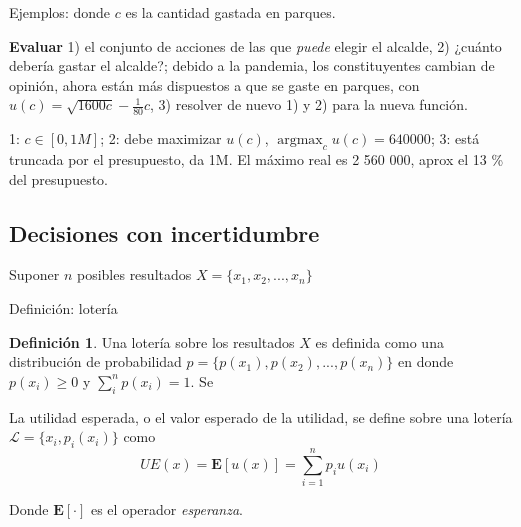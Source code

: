 \documentclass[12pt]{scrartcl}
\theoremstyle{definition}
\newtheorem{defi}{Definición}[section]
\DeclareMathOperator*{\argmax}{argmax}
\begin{document}
\begin{exbox}{Ejemplos:}
donde $c$ es la cantidad gastada en parques. 

\textbf{Evaluar} 1) el conjunto de acciones de las que \textit{puede} elegir el alcalde, 2) ¿cuánto debería gastar el alcalde?; debido a la pandemia, los constituyentes cambian de opinión, ahora están más dispuestos a que se gaste en parques, con $u(c)=\sqrt{1600c}-\frac{1}{80}c$, 3) resolver de nuevo 1) y 2) para la nueva función.

1: $c\in [0, 1M]$; 2: debe maximizar $u(c)$, $\argmax_{c} u(c) = 640000$; 3: está truncada por el presupuesto, da 1M. El máximo real es 2 560 000, aprox el 13 \% del presupuesto.
\end{exbox}

\subsection{Decisiones con incertidumbre}

Suponer $n$ posibles resultados $X=\{ x_1,x_2, ..., x_n \}$

\begin{mybox}{Definición: lotería}
\begin{defi}
    Una lotería sobre los resultados $X$ es definida como una distribución de probabilidad $p=\{ p(x_1), p(x_2), ..., p(x_n)\}$ en donde $p(x_i) \geq 0$ y $\sum_{i}^n p(x_i)=1$. Se
\end{defi}
\end{mybox}

La utilidad esperada, o el valor esperado de la utilidad, se define sobre una lotería $\mathcal{L}=\{x_i, p_i(x_i)\}$ como
\[UE(x) = \mathbf{E}[u(x)] = \sum_{i=1}^{n}p_iu(x_i)\]

Donde $\mathbf{E}[\cdot]$ es el operador \textit{esperanza}. 
\end{document}
